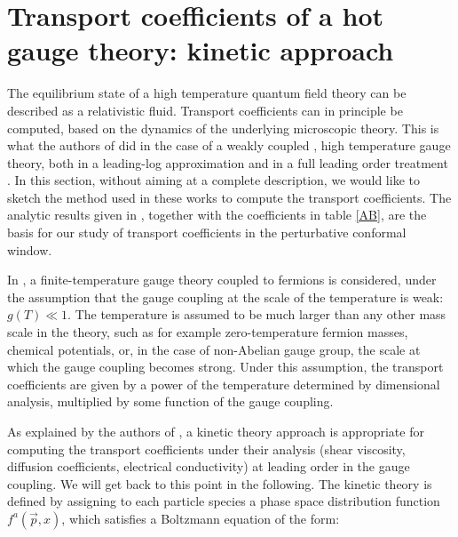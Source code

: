 
\section{Transport coefficients of a hot gauge theory: kinetic approach}

The equilibrium state of a high temperature quantum field theory can be described as a relativistic fluid. Transport coefficients can in principle be computed, based on the dynamics of the underlying microscopic theory.
This is what the authors of \cite{Arnold:2000dr,Arnold:2003zc} did in the case of a weakly coupled , high temperature gauge theory, both in a leading-log approximation \cite{Arnold:2000dr} and in a full leading order treatment \cite{Arnold:2003zc}.
In this section, without aiming at a complete description, we would like to sketch the method used in these works to compute the transport coefficients. The analytic results given in \cite{Arnold:2000dr}, together with the coefficients in table \ref{AB}, are the basis for our study of transport coefficients in the perturbative conformal window.

In \cite{Arnold:2000dr,Arnold:2003zc}, a finite-temperature gauge theory coupled to fermions is considered, under the assumption that the gauge coupling at the scale of the temperature is weak: $g(T) \ll 1$. The temperature is assumed to be much larger than any other mass scale in the theory, such as for example zero-temperature fermion masses, chemical potentials, or, in the case of non-Abelian gauge group, the scale at which the gauge coupling becomes strong. Under this assumption, the transport coefficients are given by a power of the temperature determined by dimensional analysis, multiplied by some function of the gauge coupling.

As explained by the authors of \cite{Arnold:2000dr,Arnold:2003zc}, a kinetic theory approach is appropriate for computing the transport coefficients under their analysis (shear viscosity, diffusion coefficients, electrical conductivity) at leading order in the gauge coupling. We will get back to this point in the following. The kinetic theory is defined by assigning to each particle species a phase space distribution function $f^a(\vec p, x)$, which satisfies a Boltzmann equation of the form:

